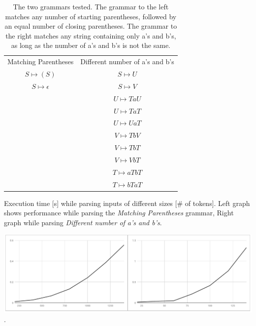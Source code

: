 		\begin{table}[h]
		\centering
		\caption{The two grammars tested. The grammar to the left matches any 
			number of starting parentheses, followed by an equal number of 
			closing parentheses. The grammar to the right matches any string 
			containing only a's and b's, as long as the number of a's and b's 
			is not the same.}
		\label{grammars}
		\begin{tabular}{c|c}
			Matching Parentheses & Different number of a's and b's \\
			$S \mapsto (S) $ & $S \mapsto U$ \\
			$S \mapsto \epsilon $ & $S \mapsto V$ \\
			& $U \mapsto TaU$  \\
			& $U \mapsto TaT$  \\
			& $U \mapsto UaT$  \\
			& $V \mapsto TbV$  \\
			& $V \mapsto TbT$  \\
			& $V \mapsto VbT$  \\
			& $T \mapsto aTbT$ \\
			& $T \mapsto bTaT$ \\
			
		\end{tabular}
		\end{table}

		\begin{table}[h]
		\centering
		\caption{Execution time [s] while parsing inputs of different sizes [\# 
			of tokens]. Left graph shows performance while parsing the 
			\emph{Matching Parentheses} grammar, Right graph while parsing 
			\emph{Different number of a's and b's}.}
		\label{performance}
		\includegraphics[width=15cm]{figure/graph.pdf}.
		\end{table}


